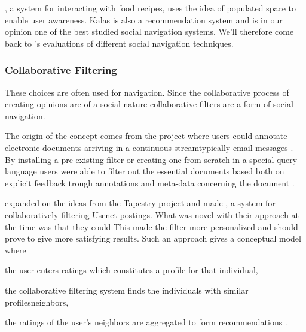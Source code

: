  \citep{svensson05}, a system for interacting with food
recipes, uses the idea of populated space to enable user awareness. Kalas is
also a recommendation system and is in our opinion one of the best studied
social navigation systems. We'll therefore come back to
\citeauthor{svensson05}'s evaluations of different social
navigation techniques.

\subsubsection{Collaborative Filtering}
\label{section:background.social.navigation.applied.forms.collaborative.filtering}

 
These choices are often used for navigation. Since the collaborative process
of creating opinions are of a social nature collaborative filters are a form
of social navigation.

The origin of the concept comes from the 
project where users could annotate electronic documents arriving in a
continuous stream\dash{}typically email messages \citep[]{goldberg92}. By
installing a pre-existing filter or creating one from scratch in a
special query language users were able to filter out the essential documents
based both on explicit feedback trough annotations and
meta-data concerning the document \citep[]{goldberg92}.

\citet{resnick94} expanded on the ideas from the Tapestry project and made
,
a system for collaboratively filtering Usenet postings. What was novel with
their approach at the time was that they could
This made the filter more personalized and should prove to give more
satisfying results. Such an approach gives a conceptual model where
\begin{inparaenum}[(i)]
  \item the user enters ratings which constitutes a profile
    for that individual,
  \item the collaborative filtering system finds
    the individuals with similar profiles\dash{}neighbors,
  \item the ratings of the user's neighbors are aggregated
    to form recommendations \citep[]{herlocker00}.
\end{inparaenum}

